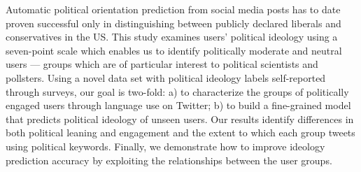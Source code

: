Automatic political orientation prediction from social media posts has to date proven successful only in distinguishing between publicly declared liberals and conservatives in the US. This study examines users' political ideology using a seven-point scale which enables us to identify politically moderate and neutral users --- groups which are of particular interest to political scientists and pollsters. Using a novel data set with political ideology labels self-reported through surveys, our goal is two-fold: a) to characterize the groups of politically engaged users through language use on Twitter; b) to build a fine-grained model that predicts political ideology of unseen users. Our results identify differences in both political leaning and engagement and the extent to which each group tweets using political keywords. Finally, we demonstrate how to improve ideology prediction accuracy by exploiting the relationships between the user groups.
